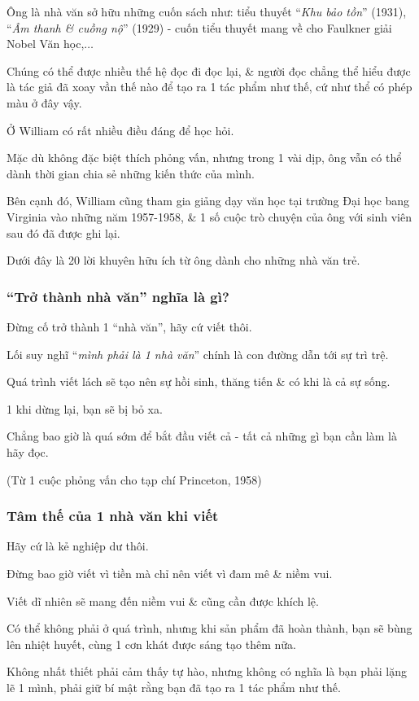 \documentclass{article}
\begin{document}
Ông là nhà văn sở hữu những cuốn sách như: tiểu thuyết ``\textit{Khu bảo tồn}'' (1931), ``\textit{Âm thanh \& cuồng nộ}'' (1929) - cuốn tiểu thuyết mang về cho Faulkner giải Nobel Văn học,$\ldots$

Chúng có thể được nhiều thế hệ đọc đi đọc lại, \& người đọc chẳng thể hiểu được là tác giả đã xoay vần thế nào để tạo ra 1 tác phẩm như thế, cứ như thể có phép màu ở đây vậy.

Ở William có rất nhiều điều đáng để học hỏi.

Mặc dù không đặc biệt thích phỏng vấn, nhưng trong 1 vài dịp, ông vẫn có thể dành thời gian chia sẻ những kiến thức của mình.

Bên cạnh đó, William cũng tham gia giảng dạy văn học tại trường Đại học bang Virginia vào những năm 1957-1958, \& 1 số cuộc trò chuyện của ông với sinh viên sau đó đã được ghi lại.

Dưới đây là 20 lời khuyên hữu ích từ ông dành cho những nhà văn trẻ.

\subsubsection{``Trở thành nhà văn'' nghĩa là gì?}
Đừng cố trở thành 1 ``nhà văn'', hãy cứ viết thôi.

Lối suy nghĩ ``\textit{mình phải là 1 nhà văn}'' chính là con đường dẫn tới sự trì trệ.

Quá trình viết lách sẽ tạo nên sự hồi sinh, thăng tiến \& có khi là cả sự sống.

1 khi dừng lại, bạn sẽ bị bỏ xa.

Chẳng bao giờ là quá sớm để bắt đầu viết cả - tất cả những gì bạn cần làm là hãy đọc.

(Từ 1 cuộc phỏng vấn cho tạp chí Princeton, 1958)

\subsubsection{Tâm thế của 1 nhà văn khi viết}
Hãy cứ là kẻ nghiệp dư thôi.

Đừng bao giờ viết vì tiền mà chỉ nên viết vì đam mê \& niềm vui.

Viết dĩ nhiên sẽ mang đến niềm vui \& cũng cần được khích lệ.

Có thể không phải ở quá trình, nhưng khi sản phẩm đã hoàn thành, bạn sẽ bùng lên nhiệt huyết, cùng 1 cơn khát được sáng tạo thêm nữa.

Không nhất thiết phải cảm thấy tự hào, nhưng không có nghĩa là bạn phải lặng lẽ 1 mình, phải giữ bí mật rằng bạn đã tạo ra 1 tác phẩm như thế.
\end{document}

